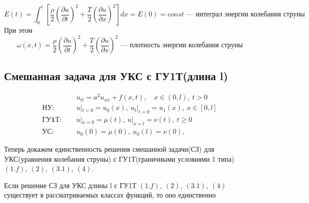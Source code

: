 \[
E(t) = \int_0^l \left[ \frac{\rho}{2} \left( \frac{\partial u}{\partial t} \right)^2 + \frac{T}{2}\left( \frac{\partial u}{\partial x} \right)^2 \right]dx = E(0) = const \text{ --- интеграл энергии колебания струны}
\]
При этом
\[
\omega(x, t) = \frac{\rho}{2} \left( \frac{\partial u}{\partial t} \right)^2 + \frac{T}{2}\left( \frac{\partial u}{\partial x} \right)^2 \text{ --- плотность энергии колебания струны}
\]

\subsection{Смешанная задача для УКС с ГУ1Т(длина l)}

\begin{align*}
& u_{tt} = a^2 u_{xx} + f(x, t), \quad x \in (0,l),\ t > 0 \tag{1.f} \\
\textbf{НУ: } \quad & u|_{t=0}=u_0(x),\ u_t|_{t=0}=u_1(x),\ x \in [0,l] \tag{2} \\
\textbf{ГУ1Т: } \quad & u|_{x=0}=\mu(t),\ u|_{x=l}=\nu(t),\ t \ge 0 \tag{3.1} \\
\textbf{УС: } \quad & u_0(0)=\mu(0),\ u_0(l)=\nu(0), \tag{4}
\end{align*}

Теперь докажем единственность решения смешанной задачи(СЗ) для УКС(уравнения колебания струны) с ГУ1Т(граничными условиями 1 типа) $(1.f),\ (2),\ (3.1),\ (4)$.

\begin{theorem}
Если решение СЗ для УКС длины l с ГУ1Т $(1.f),\ (2),\ (3.1),\ (4)$ существует в рассматриваемых классах функций, то оно единственно
\end{theorem}

